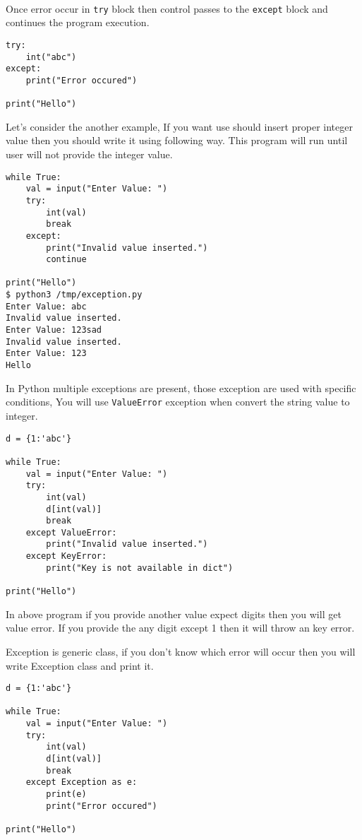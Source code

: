 \documentclass[letterpaper,12pt]{book}
\begin{document}
\paragraph{}
Once error occur in \texttt{try} block then control passes to the \texttt{except} block and continues the program execution.
\begin{lstlisting}
try:
    int("abc")
except:
    print("Error occured")

print("Hello")
\end{lstlisting}

Let's consider the another example, If you want use should insert proper integer value then you should write it using following way. This program will run until user will not provide the integer value.
\begin{lstlisting}
while True:
    val = input("Enter Value: ")
    try:
        int(val)
        break
    except:
        print("Invalid value inserted.")
        continue

print("Hello")
$ python3 /tmp/exception.py
Enter Value: abc
Invalid value inserted.
Enter Value: 123sad
Invalid value inserted.
Enter Value: 123
Hello
\end{lstlisting}

In Python multiple exceptions are present, those exception are used with specific conditions, You will use \texttt{ValueError} exception when convert the string value to integer.
\begin{lstlisting}
d = {1:'abc'}

while True:
    val = input("Enter Value: ")
    try:
        int(val)
        d[int(val)]
        break
    except ValueError:
        print("Invalid value inserted.")
    except KeyError:
        print("Key is not available in dict")

print("Hello")
\end{lstlisting}
In above program if you provide another value expect digits then you will get value error. If you provide the any digit except 1 then it will throw an key error. 

Exception is generic class, if you don't know which error will occur then you will write Exception class and print it.
\begin{lstlisting}
d = {1:'abc'}

while True:
    val = input("Enter Value: ")
    try:
        int(val)
        d[int(val)]
        break
    except Exception as e:
        print(e)
        print("Error occured")

print("Hello")
\end{lstlisting}
\end{document}
